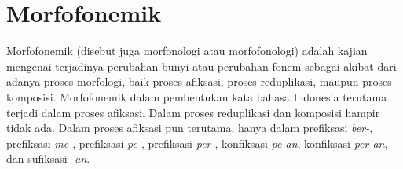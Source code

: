 






\section{Morfofonemik}
\label{sec:morfofonemik}

Morfofonemik (disebut juga morfonologi atau morfofonologi) adalah kajian mengenai terjadinya perubahan bunyi atau perubahan fonem sebagai akibat dari adanya proses morfologi, baik proses afiksasi, proses reduplikasi, maupun proses komposisi\cite{chaer:08:morfologi}. Morfofonemik dalam pembentukan kata bahasa Indonesia terutama terjadi dalam proses afiksasi. Dalam proses reduplikasi dan komposisi hampir tidak ada. Dalam proses afiksasi pun terutama, hanya dalam prefiksasi \textit{ber-}, prefiksasi \textit{me-}, prefiksasi \textit{pe-}, prefiksasi \textit{per-}, konfiksasi \textit{pe-an}, konfiksasi \textit{per-an}, dan sufiksasi \textit{-an}. 

